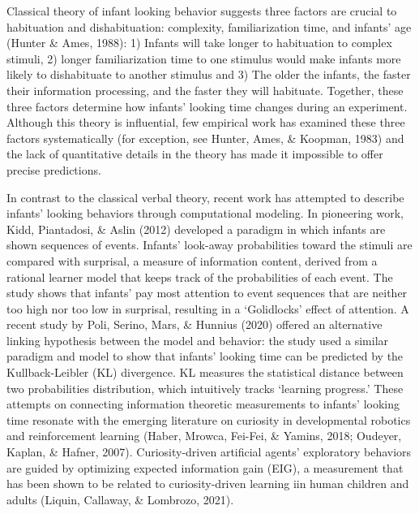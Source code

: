 \documentclass[10pt, letterpaper]{article}
\begin{document}
Classical theory of infant looking behavior suggests three factors are
crucial to habituation and dishabituation: complexity, familiarization
time, and infants' age (Hunter \& Ames, 1988): 1) Infants will take
longer to habituation to complex stimuli, 2) longer familiarization time
to one stimulus would make infants more likely to dishabituate to
another stimulus and 3) The older the infants, the faster their
information processing, and the faster they will habituate. Together,
these three factors determine how infants' looking time changes during
an experiment. Although this theory is influential, few empirical work
has examined these three factors systematically (for exception, see
Hunter, Ames, \& Koopman, 1983) and the lack of quantitative details in
the theory has made it impossible to offer precise predictions.

In contrast to the classical verbal theory, recent work has attempted to
describe infants' looking behaviors through computational modeling. In
pioneering work, Kidd, Piantadosi, \& Aslin (2012) developed a paradigm
in which infants are shown sequences of events. Infants' look-away
probabilities toward the stimuli are compared with surprisal, a measure
of information content, derived from a rational learner model that keeps
track of the probabilities of each event. The study shows that infants'
pay most attention to event sequences that are neither too high nor too
low in surprisal, resulting in a `Golidlocks' effect of attention. A
recent study by Poli, Serino, Mars, \& Hunnius (2020) offered an
alternative linking hypothesis between the model and behavior: the study
used a similar paradigm and model to show that infants' looking time can
be predicted by the Kullback-Leibler (KL) divergence. KL measures the
statistical distance between two probabilities distribution, which
intuitively tracks `learning progress.' These attempts on connecting
information theoretic measurements to infants' looking time resonate
with the emerging literature on curiosity in developmental robotics and
reinforcement learning (Haber, Mrowca, Fei-Fei, \& Yamins, 2018;
Oudeyer, Kaplan, \& Hafner, 2007). Curiosity-driven artificial agents'
exploratory behaviors are guided by optimizing expected information gain
(EIG), a measurement that has been shown to be related to
curiosity-driven learning iin human children and adults (Liquin,
Callaway, \& Lombrozo, 2021).
\end{document}
